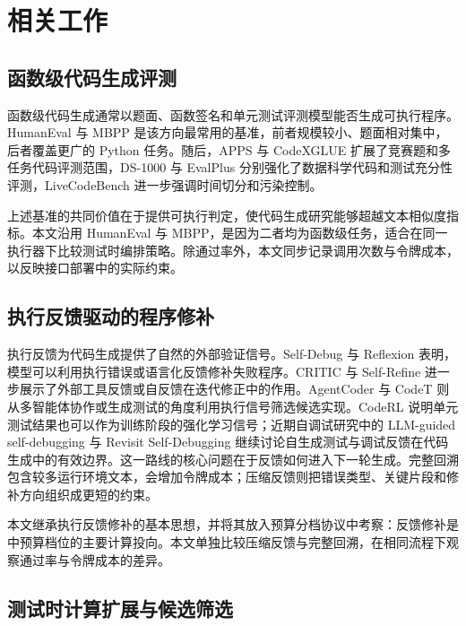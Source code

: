 \section{相关工作}
\label{sec:related}

\subsection{函数级代码生成评测}

函数级代码生成通常以题面、函数签名和单元测试评测模型能否生成可执行程序。HumanEval\cite{chen2021evaluating} 与 MBPP\cite{austin2021program} 是该方向最常用的基准，前者规模较小、题面相对集中，后者覆盖更广的 Python 任务。随后，APPS\cite{hendrycks2021apps} 与 CodeXGLUE\cite{lu2021codexglue} 扩展了竞赛题和多任务代码评测范围，DS-1000\cite{lai2023ds1000} 与 EvalPlus\cite{liu2023evalplus} 分别强化了数据科学代码和测试充分性评测，LiveCodeBench\cite{jain2024livecodebench} 进一步强调时间切分和污染控制。

上述基准的共同价值在于提供可执行判定，使代码生成研究能够超越文本相似度指标。本文沿用 HumanEval 与 MBPP，是因为二者均为函数级任务，适合在同一执行器下比较测试时编排策略。除通过率外，本文同步记录调用次数与令牌成本，以反映接口部署中的实际约束。

\subsection{执行反馈驱动的程序修补}

执行反馈为代码生成提供了自然的外部验证信号。Self-Debug\cite{chen2024selfdebug} 与 Reflexion\cite{shinn2023reflexion} 表明，模型可以利用执行错误或语言化反馈修补失败程序。CRITIC\cite{gou2024critic} 与 Self-Refine\cite{madaan2023selfrefine} 进一步展示了外部工具反馈或自反馈在迭代修正中的作用。AgentCoder\cite{huang2024agentcoder} 与 CodeT\cite{chen2023codet} 则从多智能体协作或生成测试的角度利用执行信号筛选候选实现。CodeRL\cite{le2022coderl} 说明单元测试结果也可以作为训练阶段的强化学习信号；近期自调试研究中的 LLM-guided self-debugging\cite{adnan2025llmsguided} 与 Revisit Self-Debugging\cite{chen2025revisit} 继续讨论自生成测试与调试反馈在代码生成中的有效边界。这一路线的核心问题在于反馈如何进入下一轮生成。完整回溯包含较多运行环境文本，会增加令牌成本；压缩反馈则把错误类型、关键片段和修补方向组织成更短的约束。

本文继承执行反馈修补的基本思想，并将其放入预算分档协议中考察：反馈修补是中预算档位的主要计算投向。本文单独比较压缩反馈与完整回溯，在相同流程下观察通过率与令牌成本的差异。

\subsection{测试时计算扩展与候选筛选}

